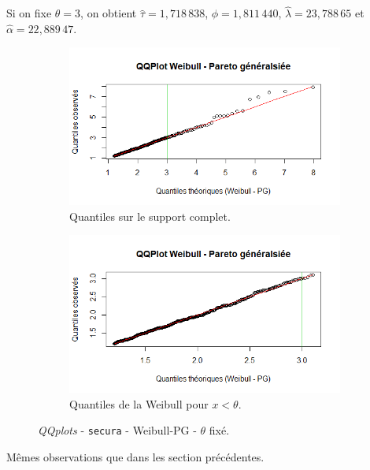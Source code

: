		Si on fixe $\theta =3$, on obtient $\hat{\tau} =1,718\,838$, $\hat{\phi}=1,811\,440$, $\hat{\lambda}=23,788\,65$ et $\hat{\alpha} = 22,889\,47$.
		
		\begin{figure}[H]
			\begin{center}
				\begin{subfigure}[b]{0.45\textwidth}
					\includegraphics[scale=0.55]{Graphiques/QQ_Wei_PG_choix_secura} 
					\caption{Quantiles sur le support complet.} \label{QQplot_Wei_PG_choix_secura}
				\end{subfigure}
				\begin{subfigure}[b]{0.4\textwidth}
					\includegraphics[scale=0.55]{Graphiques/QQ_Wei_PG_choix_t1_secura} 
					\caption{Quantiles de la Weibull pour $x < \theta$.} \label{QQplot_Wei_PG_choix_2_secura}
				\end{subfigure}
				\renewcommand{\figurename}{Illustration}
				\caption{\textit{QQplots} - \texttt{secura} - Weibull-PG - $\theta$ fixé.}
			\end{center}
		\end{figure}
		Mêmes observations que dans les section précédentes.
		
